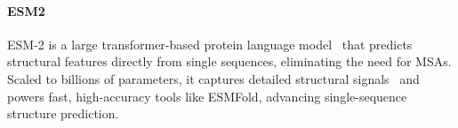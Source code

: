 \documentclass[]{Liebert_Author_revised}
\begin{document}
\paragraph{ESM2~\citeauthor{lin2023evolutionary}}
ESM-2 is a large transformer-based protein language model~\citeauthor{lin2023evolutionary} that predicts structural features directly from single sequences, eliminating the need for MSAs. Scaled to billions of parameters, it captures detailed structural signals~\citeauthor{rao2020transformer} and powers fast, high-accuracy tools like ESMFold, advancing single-sequence structure prediction.
\end{document}
